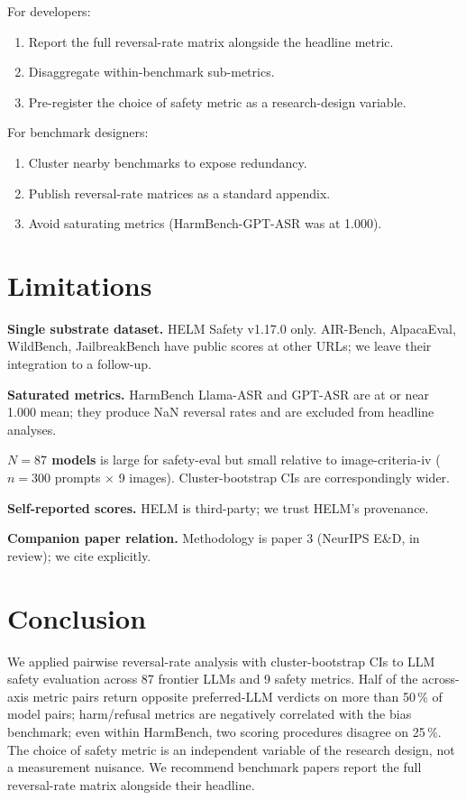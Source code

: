 \documentclass[10pt]{article}
\begin{document}
For developers:
\begin{enumerate}
\item Report the full reversal-rate matrix alongside the headline
metric.
\item Disaggregate within-benchmark sub-metrics.
\item Pre-register the choice of safety metric as a research-design
variable.
\end{enumerate}

For benchmark designers:
\begin{enumerate}
\item Cluster nearby benchmarks to expose redundancy.
\item Publish reversal-rate matrices as a standard appendix.
\item Avoid saturating metrics (HarmBench-GPT-ASR was at 1.000).
\end{enumerate}

\section{Limitations}

\textbf{Single substrate dataset.} HELM Safety v1.17.0 only.
AIR-Bench, AlpacaEval, WildBench, JailbreakBench have public scores
at other URLs; we leave their integration to a follow-up.

\textbf{Saturated metrics.} HarmBench Llama-ASR and GPT-ASR are at
or near 1.000 mean; they produce NaN reversal rates and are
excluded from headline analyses.

\textbf{$N = 87$ models} is large for safety-eval but small relative
to image-criteria-iv ($n = 300$ prompts $\times$ 9 images).
Cluster-bootstrap CIs are correspondingly wider.

\textbf{Self-reported scores.} HELM is third-party; we trust HELM's
provenance.

\textbf{Companion paper relation.} Methodology is paper 3 (NeurIPS
E\&D, in review); we cite explicitly.

\section{Conclusion}

We applied pairwise reversal-rate analysis with cluster-bootstrap
CIs to LLM safety evaluation across 87 frontier LLMs and 9 safety
metrics. Half of the across-axis metric pairs return opposite
preferred-LLM verdicts on more than 50\,\% of model pairs;
harm/refusal metrics are negatively correlated with the bias
benchmark; even within HarmBench, two scoring procedures disagree on
25\,\%. The choice of safety metric is an independent variable of
the research design, not a measurement nuisance. We recommend
benchmark papers report the full reversal-rate matrix alongside
their headline.
\end{document}
